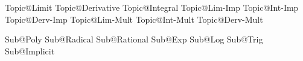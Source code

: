 Topic@Limit	         		 %
Topic@Derivative            %
Topic@Integral 				 %
Topic@Lim-Imp				 %
Topic@Int-Imp				 %
Topic@Derv-Imp				 %
Topic@Lim-Mult				 %
Topic@Int-Mult				 %
Topic@Derv-Mult				 %




Sub@Poly					%
Sub@Radical					%
Sub@Rational				%
Sub@Exp						%
Sub@Log						%
Sub@Trig					%
Sub@Implicit				%



